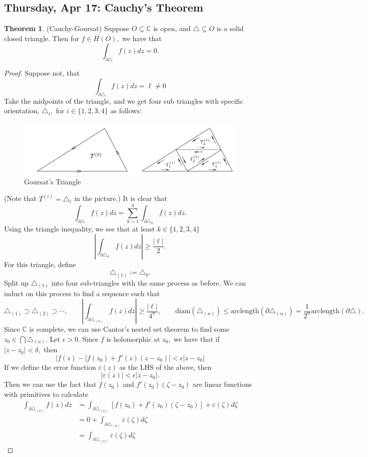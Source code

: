 \documentclass[10pt, oneside]{article}
\newcommand{\bbC}{\mathbb{C}}
\theoremstyle{definition}
\newtheorem{thm}{Theorem}
\begin{document}
\subsection{Thursday, Apr 17: Cauchy's Theorem}
\begin{thm}
    (Cauchy-Goursat) Suppose $O\subseteq \bbC$ is open, and $\triangle \subseteq O$ is a solid closed triangle. Then for $f\in H(O),$ we have that 
    \[\int_{\partial \triangle} f(z)dz = 0.\]
\end{thm}
\begin{proof}
    Suppose not, that 
    \[\int_{\partial \triangle}f(z)dz  = \ell \neq 0\] Take the midpoints of the triangle, and we get four sub triangles with specific orientation, $\triangle_i,$ for $i\in \{1,2,3,4\}$ as follows: 
    \begin{figure}[H]
        \centering
        \includegraphics[width=0.5\linewidth]{Images/Goursat.png}
        \caption{Goursat's Triangle}
    \end{figure}
    (Note that $T^{(i)} = \triangle_i$ in the picture.) It is clear that 
    \[\int_{\partial \triangle} f(z)dz = \sum_{k=1}^4 \int_{\partial \triangle_k}f(z)dz.\] Using the triangle inequality, we see that at least $k \in \{1,2,3,4\}$
    \[\left|\int_{\partial \triangle_k}f(z)dz\right| \geq \frac{|\ell|}{2}.\] For this triangle, define
    \[\triangle_{(1)}:= \triangle_k.\] Split up $\triangle_{(1)}$ into four sub-triangles with the same process as before. We can induct on this process to find a sequence such that
    \[\triangle_{(1)}\supset \triangle_{(2)}\supset \cdots , \qquad \left|\int_{\partial \triangle_{(n)}}f(z)dz\right| \geq \frac{|\ell|}{4^n}, \qquad \text{diam}(\triangle_{(n)}) \leq \text{arclength}(\partial \triangle_{(n)}) = \frac{1}{2^n}\text{arclength}(\partial \triangle).\] Since $\bbC$ is complete, we can use Cantor's nested set theorem to find some $z_0 \in \bigcap \triangle_{(n)}.$ Let $\epsilon>0.$ Since $f$ is holomorphic at $z_0,$ we have that if $|z - z_0| < \delta,$ then 
    \[|f(z) - [f(z_0) + f'(z)(z-z_0)|< \epsilon|z - z_0|\] If we define the error function $\varepsilon(z)$ as the LHS of the above, then 
    \[|\varepsilon(z)|< \epsilon |z - z_0|.\] Then we can use the fact that $f(z_0)$ and  $f'(z_0)(\zeta - z_0)$ are linear functions with primitives to calculate
    \begin{align*}
    \int_{\partial \triangle_{(n)}}f(z)dz &= \int_{\partial \triangle_{(n)}} [f(z_0) + f'(z_0)(\zeta - z_0)] + \varepsilon(\zeta) d\zeta \\
    &= 0 + \int_{\partial \triangle_{(n)}}\varepsilon(\zeta)d\zeta\\
    &= \int_{\partial \triangle_{(n)}}\varepsilon(\zeta)d\zeta
    \end{align*}
    

\end{proof}
\end{document}
